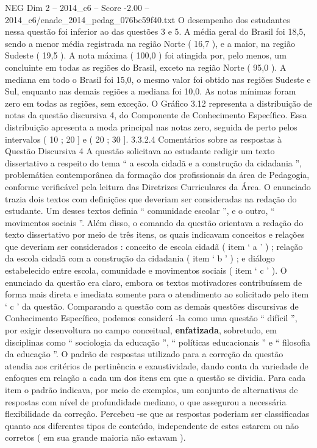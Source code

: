 \begin{textsample}{NEG Dim 2 – 2014\_c6 – Score -2.00 – 2014\_c6/enade\_2014\_pedag\_076bc59f40.txt}
O desempenho dos estudantes nessa questão foi inferior ao das questões 3 e 5.
A média geral do Brasil foi 18,5, sendo a menor média registrada na região Norte ( 16,7 ), e a maior, na região Sudeste ( 19,5 ).
A nota máxima ( 100,0 ) foi atingida por, pelo menos, um concluinte em todas as regiões do Brasil, exceto na região Norte ( 95,0 ).
A mediana em todo o Brasil foi 15,0, o mesmo valor foi obtido nas regiões Sudeste e Sul, enquanto nas demais regiões a mediana foi 10,0.
As notas mínimas foram zero em todas as regiões, sem exceção.
O Gráfico 3.12 representa a distribuição de notas da questão discursiva 4, do Componente de Conhecimento Específico.
Essa distribuição apresenta a moda principal nas notas zero, seguida de perto pelos intervalos ( 10 ; 20 ] e ( 20 ; 30 ]. 3.3.2.4 Comentários sobre as respostas à Questão Discursiva 4 A questão solicitava ao estudante redigir um texto dissertativo a respeito do tema “ a escola cidadã e a construção da cidadania ”, problemática contemporânea da formação dos profissionais da área de Pedagogia, conforme verificável pela leitura das Diretrizes Curriculares da Área.
O enunciado trazia dois textos com definições que deveriam ser consideradas na redação do estudante.
Um desses textos definia “ comunidade escolar ”, e o outro, “ movimentos sociais ”.
Além disso, o comando da questão orientava a redação do texto dissertativo por meio de três itens, os quais indicavam conceitos e relações que deveriam ser considerados : conceito de escola cidadã ( item ‘ a ’ ) ; relação da escola cidadã com a construção da cidadania ( item ‘ b ’ ) ; e diálogo estabelecido entre escola, comunidade e movimentos sociais ( item ‘ c ’ ).
O enunciado da questão era claro, embora os textos motivadores contribuíssem de forma mais direta e imediata somente para o atendimento ao solicitado pelo item ‘ c ’ da questão.
Comparando a questão com as demais questões discursivas de Conhecimento Específico, podemos considerá -la como uma questão “ difícil ”, por exigir desenvoltura no campo conceitual, \textbf{enfatizada}, sobretudo, em disciplinas como “ sociologia da educação ”, “ políticas educacionais ” e “ filosofia da educação ”.
O padrão de respostas utilizado para a correção da questão atendia aos critérios de pertinência e exaustividade, dando conta da variedade de enfoques em relação a cada um dos itens em que a questão se dividia.
Para cada item o padrão indicava, por meio de exemplos, um conjunto de alternativas de respostas com nível de profundidade mediano, o que assegurou a necessária flexibilidade da correção.
Percebeu -se que as respostas poderiam ser classificadas quanto aos diferentes tipos de conteúdo, independente de estes estarem ou não corretos ( em sua grande maioria não estavam ).

\end{textsample}
